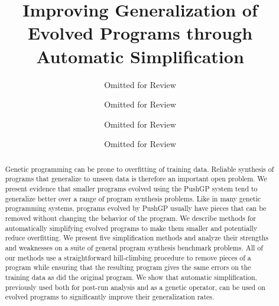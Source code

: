\documentclass[sigconf]{acmart}
\begin{document}
\title{Improving Generalization of Evolved Programs through Automatic Simplification}

\author{Omitted for Review}

\author{Omitted for Review}

\author{Omitted for Review}

\author{Omitted for Review}

%
%
%



\begin{abstract}
Genetic programming %
can be prone to overfitting of training data. Reliable synthesis of programs that generalize to unseen data is therefore an important open problem. We present evidence that smaller programs evolved using the PushGP system tend to generalize better over a range of program synthesis problems. 
Like in many genetic programming systems, programs evolved by PushGP usually 
have pieces that can be removed without changing the behavior of the program. We describe methods for automatically simplifying evolved programs to make them smaller and potentially reduce overfitting. 
We present five simplification methods and analyze their strengths and weaknesses on a suite of general program synthesis benchmark problems.
All of our methods use a straightforward hill-climbing procedure to remove pieces of a program while ensuring that the resulting program gives the same errors on the training data as did the original program. We show that automatic simplification, previously used both for post-run analysis and as a genetic operator, can be used on evolved programs to significantly improve their generalization rates.
\end{abstract}
\end{document}
